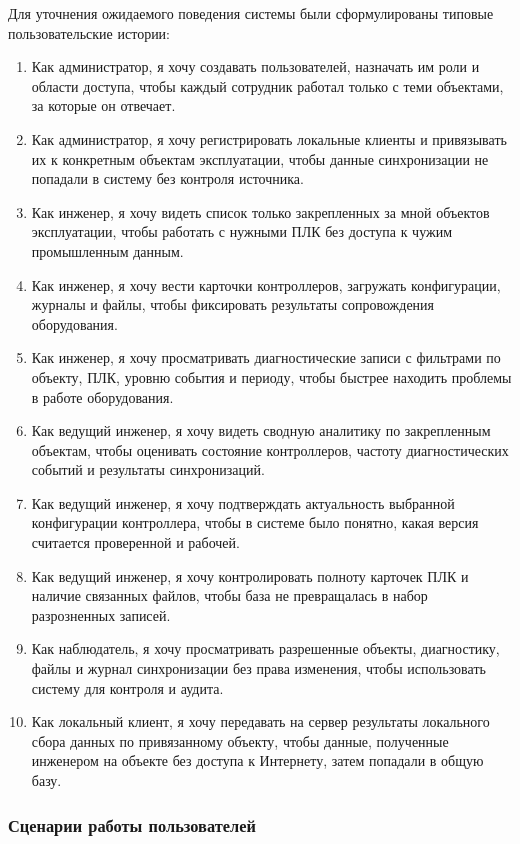 Для уточнения ожидаемого поведения системы были сформулированы типовые пользовательские истории:
\begin{enumerate}
    \item Как администратор, я хочу создавать пользователей, назначать им роли и области доступа, чтобы каждый сотрудник работал только с теми объектами, за которые он отвечает.
    \item Как администратор, я хочу регистрировать локальные клиенты и привязывать их к конкретным объектам эксплуатации, чтобы данные синхронизации не попадали в систему без контроля источника.
    \item Как инженер, я хочу видеть список только закрепленных за мной объектов эксплуатации, чтобы работать с нужными ПЛК без доступа к чужим промышленным данным.
    \item Как инженер, я хочу вести карточки контроллеров, загружать конфигурации, журналы и файлы, чтобы фиксировать результаты сопровождения оборудования.
    \item Как инженер, я хочу просматривать диагностические записи с фильтрами по объекту, ПЛК, уровню события и периоду, чтобы быстрее находить проблемы в работе оборудования.
    \item Как ведущий инженер, я хочу видеть сводную аналитику по закрепленным объектам, чтобы оценивать состояние контроллеров, частоту диагностических событий и результаты синхронизаций.
    \item Как ведущий инженер, я хочу подтверждать актуальность выбранной конфигурации контроллера, чтобы в системе было понятно, какая версия считается проверенной и рабочей.
    \item Как ведущий инженер, я хочу контролировать полноту карточек ПЛК и наличие связанных файлов, чтобы база не превращалась в набор разрозненных записей.
    \item Как наблюдатель, я хочу просматривать разрешенные объекты, диагностику, файлы и журнал синхронизации без права изменения, чтобы использовать систему для контроля и аудита.
    \item Как локальный клиент, я хочу передавать на сервер результаты локального сбора данных по привязанному объекту, чтобы данные, полученные инженером на объекте без доступа к Интернету, затем попадали в общую базу.
\end{enumerate}


\subsubsection{Сценарии работы пользователей}

